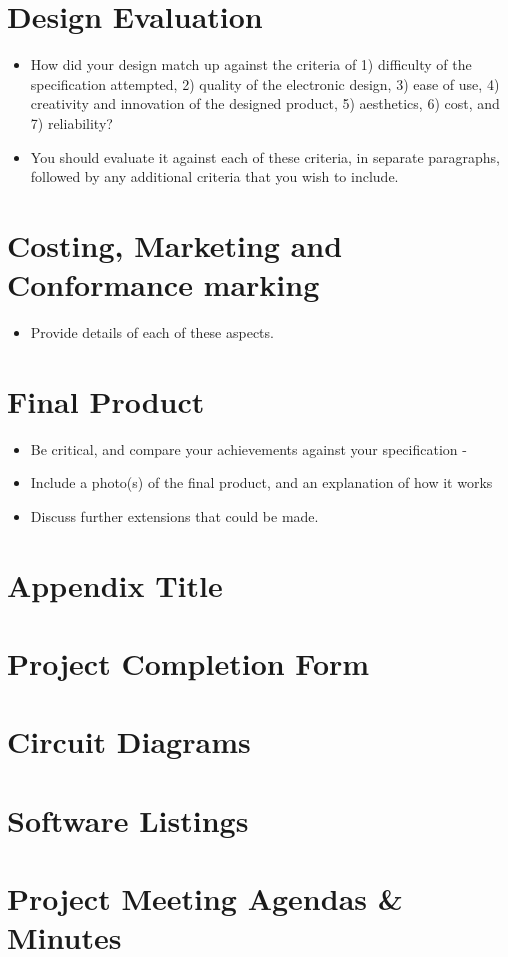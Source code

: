 \documentclass[12pt]{report}
\begin{document}
\chapter{Design Evaluation}
\begin{itemize}
\item How did your design match up against the criteria of 1) difficulty of the specification attempted, 2) quality of the electronic design, 3) ease of use, 4) creativity and innovation of the designed product, 5) aesthetics, 6) cost, and 7) reliability?
\item You should evaluate it against each of these criteria, in separate paragraphs, followed by any additional criteria that you wish to include.

\end{itemize}

\chapter{Costing, Marketing and Conformance marking}
 \begin{itemize}
\item Provide details of each of these aspects.
 \end{itemize}

\chapter{Final Product} 
\begin{itemize}
\item Be critical, and compare your achievements against your specification
-\item Include a photo(s) of the final product, and an explanation of how it works
\item Discuss further extensions that could be made.

\end{itemize}




\appendix
\chapter{Appendix Title}

\chapter{Project Completion Form}
\chapter{Circuit Diagrams}
\chapter{Software Listings}
\chapter{Project Meeting Agendas \& Minutes}



\end{document}
